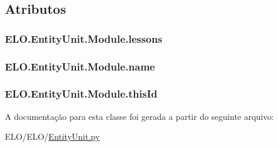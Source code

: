 \subsection{Atributos}
\hypertarget{classELO_1_1EntityUnit_1_1Module_a33eacfd2527f80841b87ccd73eb5fec0}{
\subsubsection[{lessons}]{\setlength{\rightskip}{0pt plus 5cm}E\-L\-O.\-Entity\-Unit.\-Module.\-lessons}}\label{db/de8/classELO_1_1EntityUnit_1_1Module_a33eacfd2527f80841b87ccd73eb5fec0}
\hypertarget{classELO_1_1EntityUnit_1_1Module_a82adf3b2602714a4df5f0df535902854}{
\subsubsection[{name}]{\setlength{\rightskip}{0pt plus 5cm}E\-L\-O.\-Entity\-Unit.\-Module.\-name}}\label{db/de8/classELO_1_1EntityUnit_1_1Module_a82adf3b2602714a4df5f0df535902854}
\hypertarget{classELO_1_1EntityUnit_1_1Module_a02fe16e41dd435364cb9073a8a805e96}{
\subsubsection[{this\-Id}]{\setlength{\rightskip}{0pt plus 5cm}E\-L\-O.\-Entity\-Unit.\-Module.\-this\-Id}}\label{db/de8/classELO_1_1EntityUnit_1_1Module_a02fe16e41dd435364cb9073a8a805e96}


A documentação para esta classe foi gerada a partir do seguinte arquivo\-:\begin{DoxyCompactItemize}
\item 
E\-L\-O/\-E\-L\-O/\hyperlink{EntityUnit_8py}{Entity\-Unit.\-py}\end{DoxyCompactItemize}
